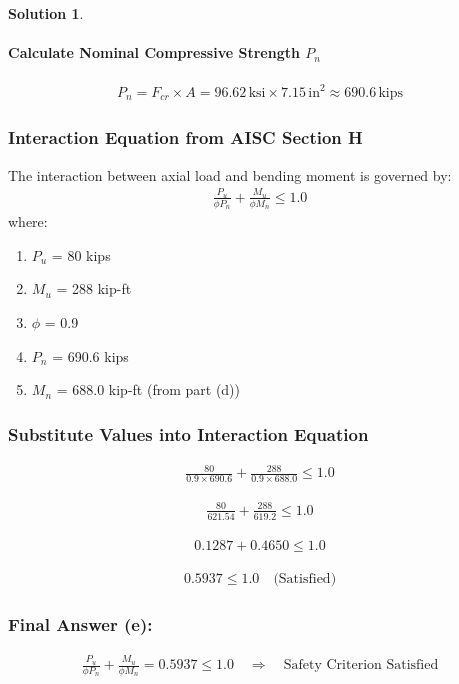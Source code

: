 \documentclass[12pt]{article}
\theoremstyle{definition} %
\newtheorem{solution}{Solution}
\theoremstyle{plain} %
\begin{document}
\begin{solution}
\begin{enumerate}
\paragraph*{Calculate Nominal Compressive Strength \( P_n \)}
\begin{align}
P_n = F_{cr} \times A = 96.62 \, \text{ksi} \times 7.15 \, \text{in}^2 \approx 690.6 \, \text{kips}
\end{align}

\subsubsection*{Interaction Equation from AISC Section H}
The interaction between axial load and bending moment is governed by:
\begin{align}
\frac{P_u}{\phi P_n} + \frac{M_u}{\phi M_n} \leq 1.0
\end{align}
where:
\begin{enumerate}
    \item \( P_u \) = 80 kips
    \item \( M_u \) = 288 kip-ft
    \item \( \phi \) = 0.9
    \item \( P_n \) = 690.6 kips
    \item \( M_n \) = 688.0 kip-ft (from part (d))
\end{enumerate}

\subsubsection*{Substitute Values into Interaction Equation}
\begin{align}
\frac{80}{0.9 \times 690.6} + \frac{288}{0.9 \times 688.0} \leq 1.0
\end{align}

\begin{align}
\frac{80}{621.54} + \frac{288}{619.2} \leq 1.0
\end{align}

\begin{align}
0.1287 + 0.4650 \leq 1.0
\end{align}

\begin{align}
0.5937 \leq 1.0 \quad \text{(Satisfied)}
\end{align}

\subsubsection*{Final Answer (e):}
\begin{align}
\boxed{
\frac{P_u}{\phi P_n} + \frac{M_u}{\phi M_n} = 0.5937 \leq 1.0 \quad \Rightarrow \quad \text{Safety Criterion Satisfied}
}
\end{align}


\end{enumerate}
\end{solution}
\end{document}
